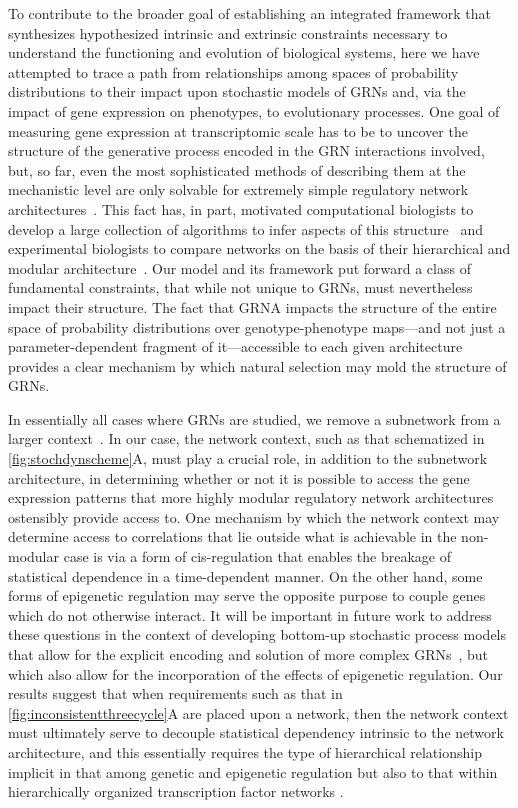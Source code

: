 To contribute to the broader goal of establishing an integrated framework that synthesizes hypothesized intrinsic and extrinsic constraints necessary to understand the functioning and evolution of biological systems, here we have attempted to trace a path from relationships among spaces of probability distributions to their impact upon stochastic models of GRNs and, via the impact of gene expression on phenotypes, to evolutionary processes. One goal of measuring gene expression at transcriptomic scale has to be to uncover the structure of the generative process encoded in the GRN interactions involved, but, so far, even the most sophisticated methods of describing them at the mechanistic level are only solvable for extremely simple regulatory network architectures~\cite{Walczak2009,Mugler2009}. This fact has, in part, motivated computational biologists to develop a large collection of algorithms to infer aspects of this structure~\cite{DeSmet2010} and experimental biologists to compare networks on the basis of their hierarchical and modular architecture~\cite{Ideker2012}. Our model and its framework put forward a class of fundamental constraints, that while not unique to GRNs, must nevertheless impact their structure. The fact that GRNA impacts the structure of the entire space of probability distributions over genotype-phenotype maps---and not just a parameter-dependent fragment of it---accessible to each given architecture provides a clear mechanism by which natural selection may mold the structure of GRNs.

In essentially all cases where GRNs are studied, we remove a subnetwork from a larger context~\cite{Alon2007}. In our case, the network context, such as that schematized in \ref{fig:stochdynscheme}A, must play a crucial role, in addition to the subnetwork architecture, in determining whether or not it is possible to access the gene expression patterns that more highly modular regulatory network architectures ostensibly provide access to. One mechanism by which the network context may determine access to correlations that lie outside what is achievable in the non-modular case is via a form of cis-regulation that enables the breakage of statistical dependence in a time-dependent manner. On the other hand, some forms of epigenetic regulation may serve the opposite purpose to couple genes which do not otherwise interact. It will be important in future work to address these questions in the context of developing bottom-up stochastic process models that allow for the explicit encoding and solution of more complex GRNs~\cite{Walczak2009,Mugler2009}, but which also allow for the incorporation of the effects of epigenetic regulation. Our results suggest that when requirements such as that in \ref{fig:inconsistentthreecycle}A are placed upon a network, then the network context must ultimately serve to decouple statistical dependency intrinsic to the network architecture, and this essentially requires the type of hierarchical relationship implicit in that among genetic and epigenetic regulation but also to that within hierarchically organized transcription factor networks \cite{Jothi2009,Bhardwaj2010,Chalancon2012,Colm}.


